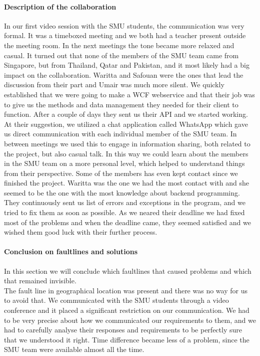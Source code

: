 \documentclass[a4paper,11pt,report]{article}
\begin{document}
\paragraph{Description of the collaboration }
In our first video session with the SMU students, the communication was very formal. It was a timeboxed meeting and we both had a teacher present outside the meeting room. In the next meetings the tone became more relaxed and casual. It turned out that none of the members of the SMU team came from Singapore, but from Thailand, Qatar and Pakistan, and it most likely had a big impact on the collaboration. Waritta and Safouan were the ones that lead the discussion from their part and Umair was much more silent. We quickly established that we were going to make a WCF webservice and that their job was to give us the methods and data management they needed for their client to function. After a couple of days they sent us their API and we started working. At their suggestion, we utilized a chat application called WhatsApp\cite{whatsapp} which gave us direct communication with each individual member of the SMU team. In between meetings we used this to engage in information sharing, both related to the project, but also casual talk. In this way we could learn about the members in the SMU team on a more personal level, which helped to understand things from their perspective. Some of the members has even kept contact since we finished the project. Waritta was the one we had the most contact with and she seemed to be the one with the most knowledge about backend programming. They continuously sent us list of errors and exceptions in the program, and we tried to fix them as soon as possible. As we neared their deadline we had fixed most of the problems and when the deadline came, they seemed satisfied and we wished them good luck with their further process. \\

\paragraph{Conclusion on faultlines and solutions}
In this section we will conclude which faultlines that caused problems and which that remained invisible. \\

The fault line in geographical location was present and there was no way for us to avoid that. We communicated with the SMU students through a video conference and it placed a significant restriction on our communication. We had to be very precise about how we communicated our requirements to them, and we had to carefully analyse their responses and requirements to be perfectly sure that we understood it right. Time difference became less of a problem, since the SMU team were available almost all the time. \\
\end{document}
